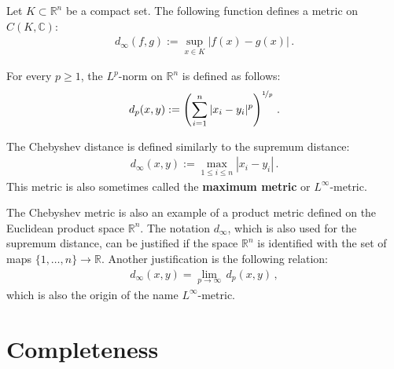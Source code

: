     \begin{example}\label{metric:supremum_distance}
        Let $K\subset\mathbb{R}^n$ be a compact set. The following function defines a metric on $C(K,\mathbb{C})$:
        \begin{gather}
            d_\infty(f,g) := \sup_{x\in K}|f(x) - g(x)|\,.
        \end{gather}
    \end{example}

    \begin{example}[p-metric]\label{metric:p_metric}
        For every $p\geq1$, the $L^p$-norm on $\mathbb{R}^n$ is defined as follows:
        \begin{gather}
            d_p(x,y) := \left(\sum_{i=1}^n|x_i-y_i|^p\right)^{\nicefrac{1}{p}}\,.
        \end{gather}
    \end{example}
    \begin{example}\label{metric:chebyshev_distance}
        The Chebyshev distance is defined similarly to the supremum distance:
        \begin{gather}
            d_\infty(x,y) := \max_{1\leq i\leq n}|x_i-y_i|\,.
        \end{gather}
        This metric is also sometimes called the \textbf{maximum metric} or $L^\infty$-metric.
    \end{example}
    \begin{remark}
        The Chebyshev metric is also an example of a product metric defined on the Euclidean product space $\mathbb{R}^n$. The notation $d_\infty$, which is also used for the supremum distance, can be justified if the space $\mathbb{R}^n$ is identified with the set of maps $\{1,\ldots,n\}\rightarrow\mathbb{R}$. Another justification is the following relation:
        \begin{gather}
            d_\infty(x,y) = \lim_{p\rightarrow\infty}\,d_p(x,y)\,,
        \end{gather}
        which is also the origin of the name $L^\infty$-metric.
    \end{remark}

\section{Completeness}


